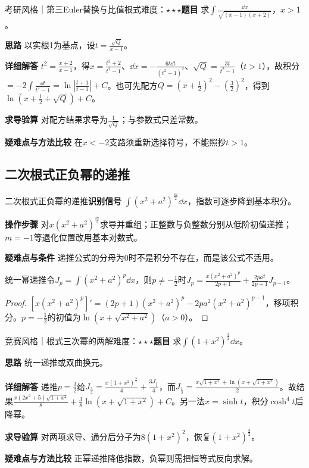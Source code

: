 \begin{example}{考研风格｜第三Euler替换与比值根式}{难度：$\star\star\star$}\label{ic:ex:indefinite_classical_complete:eulerthird}\textbf{题目} 求$\int\frac{\dd x}{\sqrt{(x-1)(x+2)}}$，$x>1$。\par \textbf{思路} 以实根1为基点，设$t=\frac{\sqrt Q}{x-1}$。\par \textbf{详细解答} $t^2=\frac{x+2}{x-1}$，得$x=\frac{t^2+2}{t^2-1}$、$\dd x=-\frac{6t\dd t}{(t^2-1)^2}$、$\sqrt Q=\frac{3t}{t^2-1}$（$t>1$），故积分$=-2\int\frac{\dd t}{t^2-1}=\ln|\frac{t+1}{t-1}|+C$。也可先配方$Q=(x+\frac{1}{2})^2-(\frac{3}{2})^2$，得到$\ln(x+\frac{1}{2}+\sqrt Q)+C$。\par \textbf{求导验算} 对配方结果求导为$\frac{1}{\sqrt Q}$；与参数式只差常数。\par \textbf{疑难点与方法比较} 在$x<-2$支路须重新选择符号，不能照抄$t>1$。\end{example}

\subsection{二次根式正负幂的递推}\label{ic:indefinite_classical_complete:powerrec}\begin{method}{二次根式正负幂的递推}\textbf{识别信号} $\int(x^2+a^2)^{\frac{m}{2}}\dd x$，指数可逐步降到基本积分。\par \textbf{操作步骤} 对$x(x^2+a^2)^{\frac{m}{2}}$求导并重组；正整数与负整数分别从低阶初值递推；$m=-1$等退化位置改用基本对数式。\par \textbf{疑难点与条件} 递推公式的分母为0时不是积分不存在，而是该公式不适用。\end{method}

\begin{theorem}{统一幂递推}令$J_p=\int(x^2+a^2)^p\dd x$，则$p\ne-\frac{1}{2}$时$J_p=\frac{x(x^2+a^2)^p}{2p+1}+\frac{2pa^2}{2p+1}J_{p-1}$。\end{theorem}\begin{proof}$[x(x^2+a^2)^p]'=(2p+1)(x^2+a^2)^p-2pa^2(x^2+a^2)^{p-1}$，移项积分。$p=-\frac{1}{2}$的初值为$\ln(x+\sqrt{x^2+a^2})$（$a>0$）。\end{proof}

\begin{example}{竞赛风格｜根式三次幂的两解}{难度：$\star\star\star$}\label{ic:ex:indefinite_classical_complete:positivehalf}\textbf{题目} 求$\int(1+x^2)^{\frac{3}{2}}\dd x$。\par \textbf{思路} 统一递推或双曲换元。\par \textbf{详细解答} 递推$p=\frac{3}{2}$给$J_{\frac{3}{2}}=\frac{x(1+x^2)^{\frac{3}{2}}}{4}+\frac{3J_{\frac{1}{2}}}{4}$，而$J_{\frac{1}{2}}=\frac{x\sqrt{1+x^2}+\ln(x+\sqrt{1+x^2})}{2}$。故结果$\frac{x(2x^2+5)\sqrt{1+x^2}}8+\frac38\ln(x+\sqrt{1+x^2})+C$。另一法$x=\sinh t$，积分$\cosh^4t$后降幂。\par \textbf{求导验算} 对两项求导、通分后分子为$8(1+x^2)^2$，恢复$(1+x^2)^{\frac{3}{2}}$。\par \textbf{疑难点与方法比较} 正幂递推降低指数，负幂则需把恒等式反向求解。\end{example}
